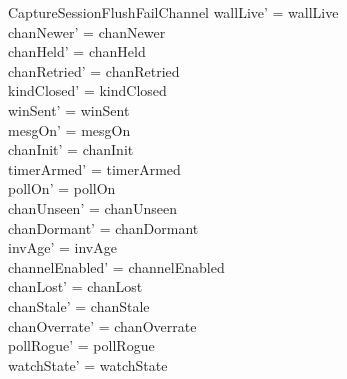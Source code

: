 \documentclass[a4paper,10pt,fleqn]{article}
\begin{document}
\begin{schema}{CaptureSessionFlushFailChannel}
  wallLive' = wallLive \\
  chanNewer' = chanNewer \\
  chanHeld' = chanHeld \\
  chanRetried' = chanRetried \\
  kindClosed' = kindClosed \\
  winSent' = winSent \\
  mesgOn' = mesgOn \\
  chanInit' = chanInit \\
  timerArmed' = timerArmed \\
  pollOn' = pollOn \\
  chanUnseen' = chanUnseen \\
  chanDormant' = chanDormant \\
  invAge' = invAge \\
  channelEnabled' = channelEnabled \\
  chanLost' = chanLost \\
  chanStale' = chanStale \\
  chanOverrate' = chanOverrate \\
  pollRogue' = pollRogue \\
  watchState' = watchState
\end{schema}
\end{document}
